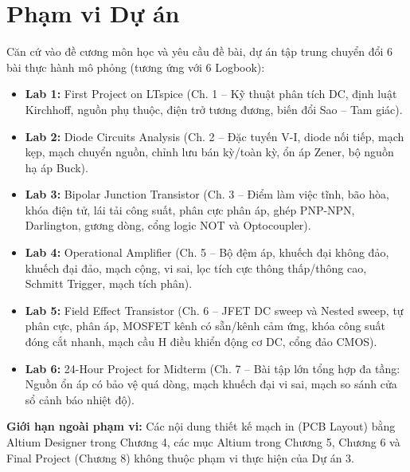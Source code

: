 \documentclass[12pt,a4paper]{report}
\begin{document}
\section{Phạm vi Dự án}
Căn cứ vào đề cương môn học và yêu cầu đề bài, dự án tập trung chuyển đổi 6 bài thực hành mô phỏng (tương ứng với 6 Logbook):
\begin{itemize}[noitemsep]
    \item \textbf{Lab 1:} First Project on LTspice (Ch. 1 -- Kỹ thuật phân tích DC, định luật Kirchhoff, nguồn phụ thuộc, điện trở tương đương, biến đổi Sao -- Tam giác).
    \item \textbf{Lab 2:} Diode Circuits Analysis (Ch. 2 -- Đặc tuyến V-I, diode nối tiếp, mạch kẹp, mạch chuyển nguồn, chỉnh lưu bán kỳ/toàn kỳ, ổn áp Zener, bộ nguồn hạ áp Buck).
    \item \textbf{Lab 3:} Bipolar Junction Transistor (Ch. 3 -- Điểm làm việc tĩnh, bão hòa, khóa điện tử, lái tải công suất, phân cực phân áp, ghép PNP-NPN, Darlington, gương dòng, cổng logic NOT và Optocoupler).
    \item \textbf{Lab 4:} Operational Amplifier (Ch. 5 -- Bộ đệm áp, khuếch đại không đảo, khuếch đại đảo, mạch cộng, vi sai, lọc tích cực thông thấp/thông cao, Schmitt Trigger, mạch tích phân).
    \item \textbf{Lab 5:} Field Effect Transistor (Ch. 6 -- JFET DC sweep và Nested sweep, tự phân cực, phân áp, MOSFET kênh có sẵn/kênh cảm ứng, khóa công suất đóng cắt nhanh, mạch cầu H điều khiển động cơ DC, cổng đảo CMOS).
    \item \textbf{Lab 6:} 24-Hour Project for Midterm (Ch. 7 -- Bài tập lớn tổng hợp đa tầng: Nguồn ổn áp có bảo vệ quá dòng, mạch khuếch đại vi sai, mạch so sánh cửa sổ cảnh báo nhiệt độ).
\end{itemize}
\textbf{Giới hạn ngoài phạm vi:} Các nội dung thiết kế mạch in (PCB Layout) bằng Altium Designer trong Chương 4, các mục Altium trong Chương 5, Chương 6 và Final Project (Chương 8) không thuộc phạm vi thực hiện của Dự án 3.
\end{document}
